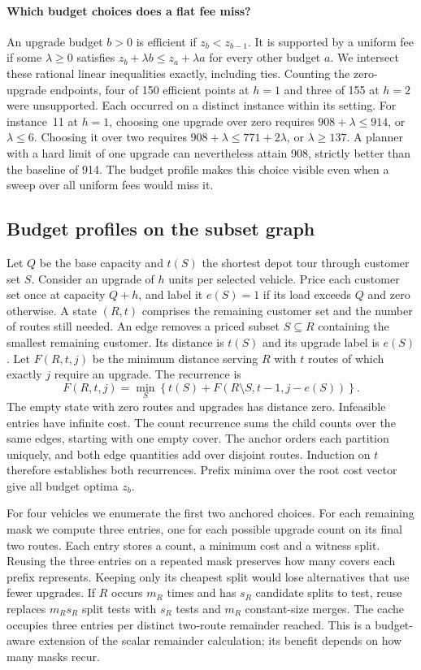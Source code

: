 \documentclass[runningheads]{llncs}
\begin{document}
\paragraph{Which budget choices does a flat fee miss?}
An upgrade budget $b>0$ is efficient if $z_b<z_{b-1}$. It is supported by a uniform fee if some $\lambda\geq0$ satisfies $z_b+\lambda b\leq z_a+\lambda a$ for every other budget $a$. We intersect these rational linear inequalities exactly, including ties. Counting the zero-upgrade endpoints, four of 150 efficient points at $h=1$ and three of 155 at $h=2$ were unsupported. Each occurred on a distinct instance within its setting. For instance~11 at $h=1$, choosing one upgrade over zero requires $908+\lambda\leq914$, or $\lambda\leq6$. Choosing it over two requires $908+\lambda\leq771+2\lambda$, or $\lambda\geq137$. A planner with a hard limit of one upgrade can nevertheless attain 908, strictly better than the baseline of 914. The budget profile makes this choice visible even when a sweep over all uniform fees would miss it.

\subsection{Budget profiles on the subset graph}
Let $Q$ be the base capacity and $t(S)$ the shortest depot tour through customer set $S$. Consider an upgrade of $h$ units per selected vehicle. Price each customer set once at capacity $Q+h$, and label it $e(S)=1$ if its load exceeds $Q$ and zero otherwise. A state $(R,t)$ comprises the remaining customer set and the number of routes still needed. An edge removes a priced subset $S\subseteq R$ containing the smallest remaining customer. Its distance is $t(S)$ and its upgrade label is $e(S)$. Let $F(R,t,j)$ be the minimum distance serving $R$ with $t$ routes of which exactly $j$ require an upgrade. The recurrence is
\[
 F(R,t,j)=\min_{S}\left\{t(S)+F(R\setminus S,t-1,j-e(S))\right\}.
\]
The empty state with zero routes and upgrades has distance zero. Infeasible entries have infinite cost. The count recurrence sums the child counts over the same edges, starting with one empty cover. The anchor orders each partition uniquely, and both edge quantities add over disjoint routes. Induction on $t$ therefore establishes both recurrences. Prefix minima over the root cost vector give all budget optima $z_b$.

For four vehicles we enumerate the first two anchored choices. For each remaining mask we compute three entries, one for each possible upgrade count on its final two routes. Each entry stores a count, a minimum cost and a witness split. Reusing the three entries on a repeated mask preserves how many covers each prefix represents. Keeping only its cheapest split would lose alternatives that use fewer upgrades. If $R$ occurs $m_R$ times and has $s_R$ candidate splits to test, reuse replaces $m_R s_R$ split tests with $s_R$ tests and $m_R$ constant-size merges. The cache occupies three entries per distinct two-route remainder reached. This is a budget-aware extension of the scalar remainder calculation; its benefit depends on how many masks recur.
\end{document}
